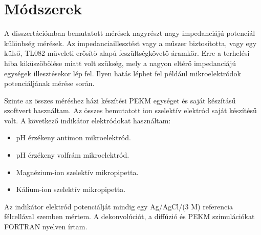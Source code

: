 \section{Módszerek}
A disszertációmban bemutatott mérések nagyrészt nagy impedanciájú potenciál különbség mérések.
Az impedanciaillesztést vagy a műszer biztosította, vagy egy külső, TL082 műveleti erősítő alapú feszültségkövető áramkör.
Erre a terhelési hiba kiküszöbölése miatt volt szükség, mely a nagyon eltérő impedanciájú egységek illesztésekor lép fel.
Ilyen hatás léphet fel például mikroelektródok potenciáljának mérése során.

Szinte az összes méréshez házi készítési PEKM egységet és saját készításű szoftvert használtam.
Az összes bemutatott ion szelektív elektród saját készítésű volt.
A következő indikátor elektródokat használtam:

\begin{itemize}
\item pH érzékeny antimon mikroelektród.
\item pH érzékeny volfrám mikroelektród.
\item Magnézium-ion szelektív mikropipetta.
\item Kálium-ion szelektív mikropipetta.
\end{itemize}

Az indikátor elektród potenciálját mindig egy Ag/AgCl/(3 M) referencia félcellával szemben mértem.
A dekonvolúciót, a diffúzió és PEKM szimulációkat FORTRAN nyelven írtam.
